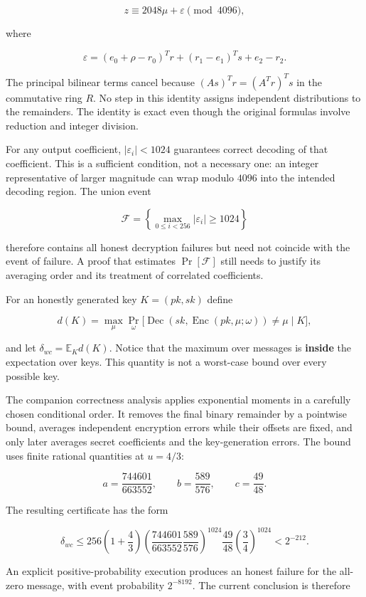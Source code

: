 \documentclass[
  11pt,
  a4paper,
  oneside]{report}
\begin{document}
\[
 z\equiv2048\mu+\varepsilon\pmod{4096},
\]

where

\[
\boxed{\displaystyle
\varepsilon=(e_0+\rho-r_0)^Tr+(r_1-e_1)^Ts+e_2-r_2.}
\]

The principal bilinear terms cancel because \((As)^Tr=(A^Tr)^Ts\) in the
commutative ring \(R\). No step in this identity assigns independent
distributions to the remainders. The identity is exact even though the
original formulas involve reduction and integer division.

For any output coefficient, \(|\varepsilon_i|<1024\) guarantees correct
decoding of that coefficient. This is a sufficient condition, not a
necessary one: an integer representative of larger magnitude can wrap
modulo \(4096\) into the intended decoding region. The union event

\[
\mathcal F=\left\{\max_{0\le i<256}|\varepsilon_i|\ge1024\right\}
\]

therefore contains all honest decryption failures but need not coincide
with the event of failure. A proof that estimates \(\Pr[\mathcal F]\)
still needs to justify its averaging order and its treatment of
correlated coefficients.

For an honestly generated key \(K=(pk,sk)\) define

\[
 d(K)=\max_\mu\Pr_\omega\bigl[
 \operatorname{Dec}(sk,\operatorname{Enc}(pk,\mu;\omega))\ne\mu\mid K
 \bigr],
\]

and let \(\delta_{wc}=\mathbb E_Kd(K)\). Notice that the maximum over
messages is \textbf{inside} the expectation over keys. This quantity is
not a worst-case bound over every possible key.

The companion correctness analysis applies exponential moments in a
carefully chosen conditional order. It removes the final binary
remainder by a pointwise bound, averages independent encryption errors
while their offsets are fixed, and only later averages secret
coefficients and the key-generation errors. The bound uses finite
rational quantities at \(u=4/3\):

\[
 a=\frac{744601}{663552},\qquad
 b=\frac{589}{576},\qquad
 c=\frac{49}{48}.
\]

The resulting certificate has the form

\[
\delta_{wc}\le
256\left(1+\frac43\right)
\left(\frac{744601}{663552}\frac{589}{576}\right)^{1024}
\frac{49}{48}\left(\frac34\right)^{1024}
<2^{-212}.
\]

An explicit positive-probability execution produces an honest failure
for the all-zero message, with event probability \(2^{-8192}\). The
current conclusion is therefore
\end{document}
